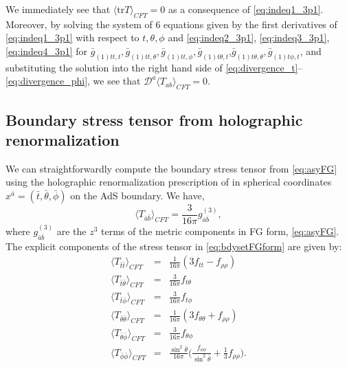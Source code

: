 \documentclass[a4paper,11pt]{article}
\numberwithin{equation}{section}
\begin{document}
We immediately see that $\langle \text{tr}T\rangle_{CFT}=0$ as a consequence of \eqref{eq:indeq1_3p1}.
Moreover, by solving the system of 6 equations given by the first derivatives of \eqref{eq:indeq1_3p1} with respect to $t,\theta,\phi$ and \eqref{eq:indeq2_3p1}, \eqref{eq:indeq3_3p1}, \eqref{eq:indeq4_3p1} for $\bar{g}_{(1) \text{$tt$},t},\bar{g}_{(1) \text{$tt$},\theta},\bar{g}_{(1) \text{$tt$},\phi },\bar{g}_{(1) \text{$t$$\theta $},t}$,$\bar{g}_{(1)\text{$t$$\theta $},\theta },\bar{g}_{(1) \text{$t$$\phi $},t}$, and substituting the solution into the right hand side of \eqref{eq:divergence_t}--\eqref{eq:divergence_phi}, we see that $\mathcal{D}^a \langle T_{ab}\rangle_{CFT}=0$.

\subsection{Boundary stress tensor from holographic renormalization}
\label{sec:HoloRen}

We can straightforwardly compute the boundary stress tensor from \eqref{eq:asyFG} using the holographic renormalization prescription of \cite{deHaro:2000vlm} in spherical coordinates $x^{\bar{a}}=(\bar{t},\bar{\theta},\bar{\phi})$ on the AdS boundary. We have,
\begin{equation}
\label{eq:bdysetFGform}
\langle T_{\bar{a}\bar{b}}\rangle_{CFT}=\frac{3}{16\pi}g^{(3)}_{\bar{a}\bar{b}},
\end{equation}
where $g^{(3)}_{\bar{a}\bar{b}}$ are the $z^3$ terms of the metric components in FG form, \eqref{eq:asyFG}.
The explicit components of the stress tensor in \eqref{eq:bdysetFGform} are given by:
\begin{eqnarray}
\label{eq:set_explicit_2}
\langle T_{\bar{t}\bar{t}}\rangle_{CFT}&=&\frac{1}{16\pi}(3f_{tt}-f_{\rho\rho}) \nonumber \\
\langle T_{\bar{t}\bar{\theta}}\rangle_{CFT}&=&\frac{3}{16\pi}f_{t\theta} \nonumber \\
\langle T_{\bar{t}\bar{\phi}}\rangle_{CFT}&=&\frac{3}{16\pi}f_{t\phi} \nonumber \\
\langle T_{\bar{\theta}\bar{\theta}}\rangle_{CFT}&=&\frac{1}{16\pi} (3f_{\theta\theta}+f_{\rho\rho}) \nonumber \\
\langle T_{\bar{\theta}\bar{\phi}}\rangle_{CFT}&=&\frac{3}{16\pi}f_{\theta\phi} \nonumber \\
\langle T_{\bar{\phi}\bar{\phi}}\rangle_{CFT}&=&\frac{\sin^2\bar{\theta}}{16\pi} \biggl(\frac{f_{\phi\phi}}{ \sin^2\bar{\theta}}+\frac{1}{3}f_{\rho\rho}\biggr).
\end{eqnarray}
\end{document}
